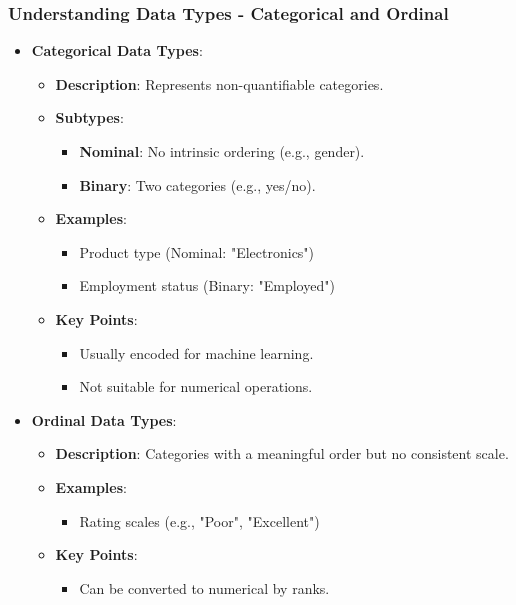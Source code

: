 \documentclass[aspectratio=169]{beamer}
\begin{document}
\begin{frame}[fragile]
    \frametitle{Understanding Data Types - Categorical and Ordinal}
    \begin{itemize}
        \item \textbf{Categorical Data Types}:
            \begin{itemize}
                \item \textbf{Description}: Represents non-quantifiable categories.
                \item \textbf{Subtypes}:
                    \begin{itemize}
                        \item \textbf{Nominal}: No intrinsic ordering (e.g., gender).
                        \item \textbf{Binary}: Two categories (e.g., yes/no).
                    \end{itemize}
                \item \textbf{Examples}: 
                    \begin{itemize}
                        \item Product type (Nominal: "Electronics")
                        \item Employment status (Binary: "Employed")
                    \end{itemize}
                \item \textbf{Key Points}:
                    \begin{itemize}
                        \item Usually encoded for machine learning.
                        \item Not suitable for numerical operations.
                    \end{itemize}
            \end{itemize}
        
        \item \textbf{Ordinal Data Types}:
            \begin{itemize}
                \item \textbf{Description}: Categories with a meaningful order but no consistent scale.
                \item \textbf{Examples}: 
                    \begin{itemize}
                        \item Rating scales (e.g., "Poor", "Excellent")
                    \end{itemize}
                \item \textbf{Key Points}:
                    \begin{itemize}
                        \item Can be converted to numerical by ranks.
                    \end{itemize}
            \end{itemize}
    \end{itemize}
\end{frame}
\end{document}
